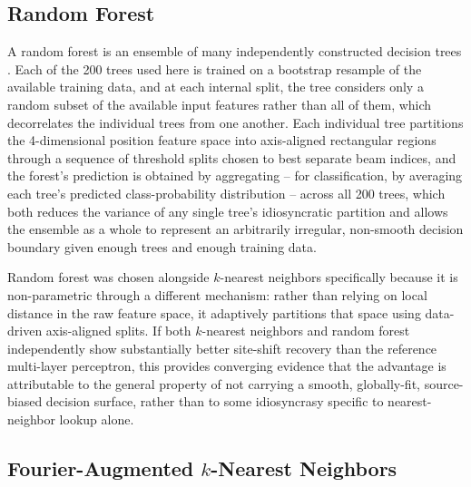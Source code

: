 \documentclass{iutbscthesis}
\begin{document}
\subsection{Random Forest}
\label{sec:rfstage2}

A random forest is an ensemble of many independently constructed decision trees \cite{breiman2001randomforests}. Each of the 200 trees used here is trained on a bootstrap resample of the available training data, and at each internal split, the tree considers only a random subset of the available input features rather than all of them, which decorrelates the individual trees from one another. Each individual tree partitions the 4-dimensional position feature space into axis-aligned rectangular regions through a sequence of threshold splits chosen to best separate beam indices, and the forest's prediction is obtained by aggregating -- for classification, by averaging each tree's predicted class-probability distribution -- across all 200 trees, which both reduces the variance of any single tree's idiosyncratic partition and allows the ensemble as a whole to represent an arbitrarily irregular, non-smooth decision boundary given enough trees and enough training data.

Random forest was chosen alongside $k$-nearest neighbors specifically because it is non-parametric through a different mechanism: rather than relying on local distance in the raw feature space, it adaptively partitions that space using data-driven axis-aligned splits. If both $k$-nearest neighbors and random forest independently show substantially better site-shift recovery than the reference multi-layer perceptron, this provides converging evidence that the advantage is attributable to the general property of not carrying a smooth, globally-fit, source-biased decision surface, rather than to some idiosyncrasy specific to nearest-neighbor lookup alone.

\subsection{Fourier-Augmented $k$-Nearest Neighbors}
\label{sec:fourierstage2}
\end{document}
